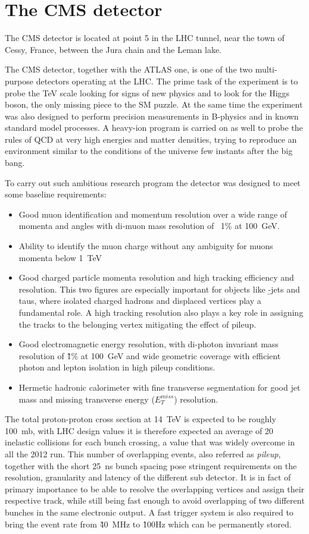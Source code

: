 \section{The CMS detector}

The CMS detector is located at point 5 in the LHC tunnel, near the town of Cessy, France, between the Jura chain and the Leman lake.
 
The CMS detector, together with the ATLAS one, is one of the two multi-purpose detectors operating at the LHC. The prime task of the experiment is to probe the TeV scale looking for signs of new physics and to look for the Higgs boson, the only missing piece to the SM puzzle. At the same time the experiment was also designed to perform precision measurements in B-physics and in known standard model processes. A heavy-ion program is carried on as well to probe the rules of QCD at very high energies and matter densities, trying to reproduce an environment similar to the conditions of the universe few instants after the big bang.

To carry out such ambitious research program the detector was designed to meet some baseline requirements:
\begin{itemize}
\item Good muon identification and momentum resolution over a wide range of momenta and angles with di-muon mass resolution of ~1\% at 100~GeV.
\item Ability to identify the muon charge without any ambiguity for muons momenta below 1~TeV
\item Good charged particle momenta resolution and high tracking efficiency and resolution. This two figures are especially important for objects like \b-jets and taus, where isolated charged hadrons and displaced vertices play a fundamental role. A high tracking resolution also plays a key role in assigning the tracks to the belonging vertex mitigating the effect of pileup.
\item Good electromagnetic energy resolution, with di-photon invariant mass resolution of \~1\% at 100~GeV and wide geometric coverage with efficient photon and lepton isolation in high pileup conditions.
\item Hermetic hadronic calorimeter with fine transverse segmentation for good jet mass and missing transverse energy ($E_T^{miss}$) resolution. 
\end{itemize}

The total proton-proton cross section at 14~TeV is expected to be roughly 100~mb, with LHC design values it is therefore expected an average of 20 inelastic collisions for each bunch crossing, a value that was widely overcome in all the 2012 run. This number of overlapping events, also referred as \emph{pileup}, together with the short 25~ns bunch spacing pose stringent requirements on the resolution, granularity and latency of the different sub detector. It is in fact of primary importance to be able to resolve the overlapping vertices and assign their respective track, while still being fast enough to avoid overlapping of two different bunches in the same electronic output. A fast trigger system is also required to bring the event rate from \~40~MHz to \~100Hz which can be permanently stored.

